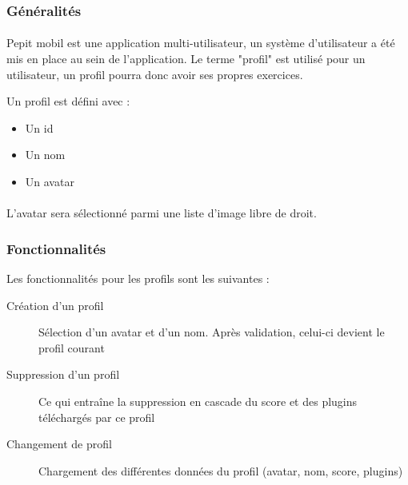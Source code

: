 \subsubsection{Généralités}
\paragraph{}Pepit mobil est une application multi-utilisateur, un système d'utilisateur a été mis en place au sein de l'application. Le terme "profil" est utilisé pour un utilisateur, un profil pourra donc avoir ses propres exercices.

Un profil est défini avec :
\begin{itemize}
\item Un id
\item Un nom
\item Un avatar
\end{itemize}

\paragraph{}L'avatar sera sélectionné parmi une liste d'image libre de droit.

\subsubsection{Fonctionnalités}
Les fonctionnalités pour les profils sont les suivantes :
\begin{description}
\item[Création d'un profil] Sélection d'un avatar et d'un nom. Après validation, celui-ci devient le profil courant
\item[Suppression d'un profil] Ce qui entra\^{i}ne la suppression en cascade du score et des plugins téléchargés par ce profil
\item[Changement de profil] Chargement des différentes données du profil (avatar, nom, score, plugins)
\end{description}